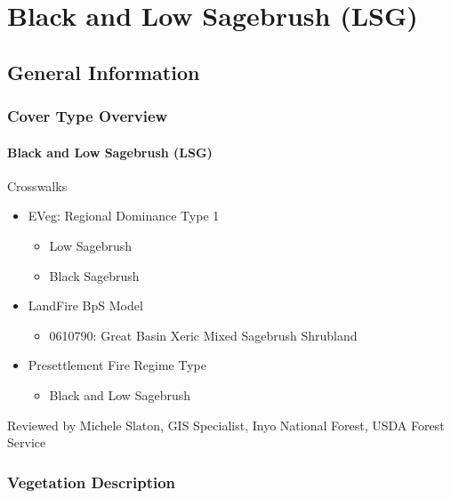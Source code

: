 
\section{Black and Low Sagebrush (LSG)}
\label{lsg-description}

\subsection{General Information}

\subsubsection{Cover Type Overview}

\paragraph{Black and Low Sagebrush (LSG)}

Crosswalks
\begin{itemize}
	\item EVeg: Regional Dominance Type 1
	\begin{itemize}
		\item Low Sagebrush
		\item Black Sagebrush
	\end{itemize}

	\item LandFire BpS Model
	\begin{itemize}
		\item 0610790: Great Basin Xeric Mixed Sagebrush Shrubland
	\end{itemize}

	\item Presettlement Fire Regime Type
	\begin{itemize}
		\item Black and Low Sagebrush
	\end{itemize}
\end{itemize}

Reviewed by Michele Slaton, GIS Specialist, Inyo National Forest, USDA Forest Service

\subsubsection{Vegetation Description}
